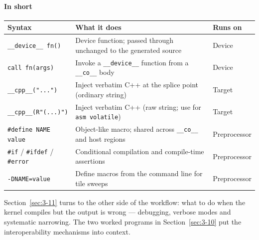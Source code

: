 \paragraph*{In short}

\begin{table}[htbp]
\centering\small
\begin{tabularx}{\linewidth}{@{}lXX@{}}
\toprule
\textbf{Syntax} & \textbf{What it does} & \textbf{Runs on} \\
\midrule
\texttt{\_\allowbreak{}\_\allowbreak{}device\_\allowbreak{}\_\allowbreak{} fn()} & Device function; passed through unchanged to the generated source & Device \\
\texttt{call fn(args)} & Invoke a \texttt{\_\_device\_\_} function from a \texttt{\_\_co\_\_} body & Device \\
\texttt{\_\allowbreak{}\_\allowbreak{}cpp\_\allowbreak{}\_\allowbreak{}(".\allowbreak{}.\allowbreak{}.\allowbreak{}")} & Inject verbatim C++ at the splice point (ordinary string) & Target \\
\texttt{\_\allowbreak{}\_\allowbreak{}cpp\_\allowbreak{}\_\allowbreak{}(R"(.\allowbreak{}.\allowbreak{}.\allowbreak{})")} & Inject verbatim C++ (raw string; use for \texttt{asm volatile}) & Target \\
\texttt{\#\allowbreak{}define NAME value} & Object-like macro; shared across \texttt{\_\_co\_\_} and host regions & Preprocessor \\
\texttt{\#if} / \texttt{\#ifdef} / \texttt{\#error} & Conditional compilation and compile-time assertions & Preprocessor \\
\texttt{-DNAME=value} & Define macros from the command line for tile sweeps & Preprocessor \\
\bottomrule
\end{tabularx}
\end{table}

Section~\ref{sec:3-11} turns to the other side of the workflow: what to do when the kernel compiles but the output is wrong --- debugging, verbose modes and systematic narrowing. The two worked programs in Section~\ref{sec:3-10} put the interoperability mechanisms into context.
